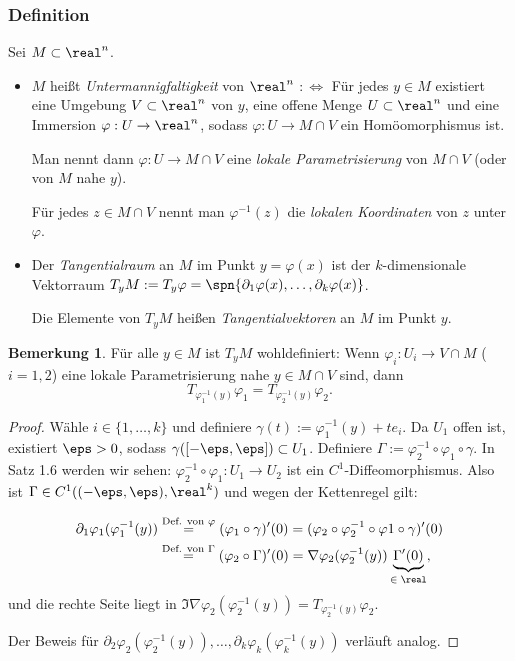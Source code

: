 \documentclass[
 a4paper,
 12pt,
 parskip=half
 ]{scrartcl}
\theoremstyle{plain}
\theoremstyle{definition}
\newtheorem*{rmrk}{Bemerkung}
\numberwithin{equation}{section}
\begin{document}
\subsubsection{Definition}
Sei $M \subset \real^n$.
\begin{itemize}
  \item $M$ heißt \emph{Untermannigfaltigkeit} von $\real^n$ $:\Leftrightarrow$ Für jedes $y \in M$ existiert eine Umgebung $V \subset \real^n$ von $y$, eine offene Menge $U \subset \real^n$ und eine Immersion $\varphi: U \to \real^n$, sodass $\varphi: U \to M \cap V$ ein Homöomorphismus ist.
  
  Man nennt dann $\varphi: U \to M \cap V$ eine \emph{lokale Parametrisierung} von $M \cap V$ (oder von $M$ nahe $y$). 
  
  Für jedes $z \in M \cap V$ nennt man $\varphi^{-1}(z)$ die \emph{lokalen Koordinaten} von $z$ unter $\varphi$.
  \item Der \emph{Tangentialraum} an $M$ im Punkt $y = \varphi(x)$ ist der $k$-dimensionale Vektorraum $T_y M := T_y \varphi = \spn \{ \partial_1 \varphi(x), \ldots, \partial_k \varphi(x) \}$. 
  
  Die Elemente von $T_y M$ heißen \emph{Tangentialvektoren} an $M$ im Punkt $y$.
\end{itemize}

\begin{rmrk}
 Für alle $y \in M$ ist $T_y M$ wohldefiniert: Wenn $\varphi_i: U_i \to V \cap M$ ($i = 1,2$) eine lokale Parametrisierung nahe $y \in M \cap V$ sind, dann
 \[ T_{\varphi^{-1}_1(y)} \varphi_1 = T_{\varphi^{-1}_2(y)} \varphi_2. \]
\end{rmrk}

\begin{proof}
 Wähle $i \in \{1, \ldots, k\}$ und definiere $\gamma(t) := \varphi_1^{-1}(y) + t e_i$.
 Da $U_1$ offen ist, existiert $\eps > 0$, sodass $\gamma( [-\eps, \eps] ) \subset U_1$. Definiere $\Gamma := \varphi_2^{-1} \circ \varphi_1 \circ \gamma$. In Satz 1.6 werden wir sehen: $\varphi_2^{-1} \circ \varphi_1\colon U_1 \to U_2$ ist ein $C^1$-Diffeomorphismus. Also ist $\Gamma \in C^1( (-\eps,\eps), \real^k)$ und wegen der Kettenregel gilt:
 
 \[ \begin{aligned}\partial_1 \varphi_1 ( \varphi_1^{-1} (y) ) &\stackrel{\text{Def. von } \varphi}{=} (\varphi_1 \circ \gamma)' (0) = (\varphi_2 \circ \varphi_2^{-1}\circ\varphi1\circ\gamma)'(0) \\ &\stackrel{\text{Def. von } \Gamma}{=} (\varphi_2 \circ \Gamma)' (0) = \nabla \varphi_2( \varphi_2^{-1}(y) ) \underbrace{\Gamma'(0)}_{\text{$\in \real$}}, \end{aligned}\]
 und die rechte Seite liegt in $\Im \nabla \varphi_2( \varphi_2^{-1}(y)) = T_{\varphi_2^{-1}(y)}\varphi_2$.
 
 Der Beweis für $\partial_2 \varphi_2(\varphi_2^{-1}(y)), \ldots, \partial_k \varphi_k(\varphi_k^{-1}(y))$ verläuft analog.
\end{proof}
\end{document}
